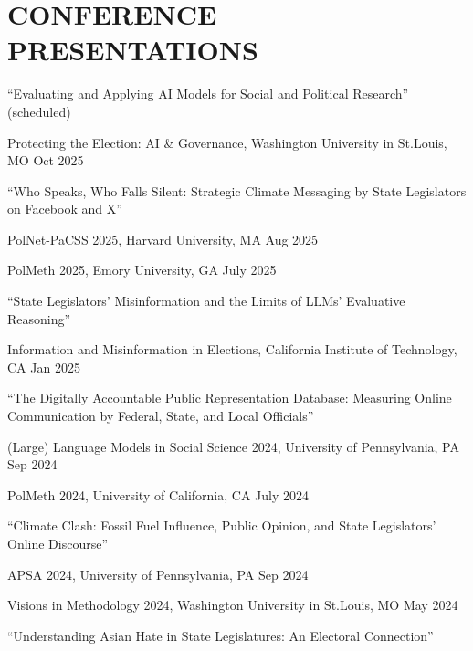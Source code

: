 \documentclass[10.5pt,]{article}
\providecommand{\tightlist}{%
	\setlength{\itemsep}{0pt}\setlength{\parskip}{0pt}}
\renewenvironment{itemize}{
	\begin{list}{}{
			\setlength{\leftmargin}{1.5em}
		}
	}{
	\end{list}
}
\begin{document}
\section{CONFERENCE PRESENTATIONS}\label{conference-presentations}

\begin{itemize}
\tightlist
\item
  ``Evaluating and Applying AI Models for Social and Political
  Research'' (scheduled)

  \begin{itemize}
  \tightlist
  \item
    Protecting the Election: AI \& Governance, Washington University in
    St.Louis, MO \hfill  Oct 2025
  \end{itemize}
\item
  ``Who Speaks, Who Falls Silent: Strategic Climate Messaging by State
  Legislators on Facebook and X''

  \begin{itemize}
  \tightlist
  \item
    PolNet-PaCSS 2025, Harvard University, MA \hfill Aug 2025
  \item
    PolMeth 2025, Emory University, GA \hfill July 2025
  \end{itemize}
\item
  ``State Legislators' Misinformation and the Limits of LLMs' Evaluative
  Reasoning''

  \begin{itemize}
  \tightlist
  \item
    Information and Misinformation in Elections, California Institute of
    Technology, CA \hfill Jan 2025
  \end{itemize}
\item
  ``The Digitally Accountable Public Representation Database: Measuring
  Online Communication by Federal, State, and Local Oﬀicials''

  \begin{itemize}
  \tightlist
  \item
    (Large) Language Models in Social Science 2024, University of
    Pennsylvania, PA \hfill Sep 2024
  \item
    PolMeth 2024, University of California, CA \hfill July 2024
  \end{itemize}
\item
  ``Climate Clash: Fossil Fuel Influence, Public Opinion, and State
  Legislators' Online Discourse''

  \begin{itemize}
  \tightlist
  \item
    APSA 2024, University of Pennsylvania, PA \hfill Sep 2024
  \item
    Visions in Methodology 2024, Washington University in St.Louis, MO
    \hfill May 2024
  \end{itemize}
\item
  ``Understanding Asian Hate in State Legislatures: An Electoral
  Connection''


\end{itemize}
\end{document}
